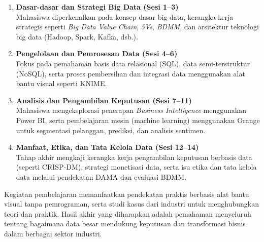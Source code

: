 \begin{enumerate}
	\item \textbf{Dasar-dasar dan Strategi Big Data (Sesi 1--3)} \\
	Mahasiswa diperkenalkan pada konsep dasar big data, kerangka kerja strategis seperti \textit{Big Data Value Chain}, \textit{5Vs}, \textit{BDMM}, dan arsitektur teknologi big data (Hadoop, Spark, Kafka, dsb.).
	
	\item \textbf{Pengelolaan dan Pemrosesan Data (Sesi 4--6)} \\
	Fokus pada pemahaman basis data relasional (SQL), data semi-terstruktur (NoSQL), serta proses pembersihan dan integrasi data menggunakan alat bantu visual seperti KNIME.
	
	\item \textbf{Analisis dan Pengambilan Keputusan (Sesi 7--11)} \\
	Mahasiswa mengeksplorasi penerapan \textit{Business Intelligence} menggunakan Power BI, serta pembelajaran mesin (machine learning) menggunakan Orange untuk segmentasi pelanggan, prediksi, dan analisis sentimen.
	
	\item \textbf{Manfaat, Etika, dan Tata Kelola Data (Sesi 12--14)} \\
	Tahap akhir mengkaji kerangka kerja pengambilan keputusan berbasis data (seperti CRISP-DM), strategi monetisasi data, serta isu etika dan tata kelola data melalui pendekatan DAMA dan evaluasi BDMM.
\end{enumerate}

Kegiatan pembelajaran memanfaatkan pendekatan praktis berbasis alat bantu visual tanpa pemrograman, serta studi kasus dari industri untuk menghubungkan teori dan praktik. Hasil akhir yang diharapkan adalah pemahaman menyeluruh tentang bagaimana data besar mendukung keputusan dan transformasi bisnis dalam berbagai sektor industri.
